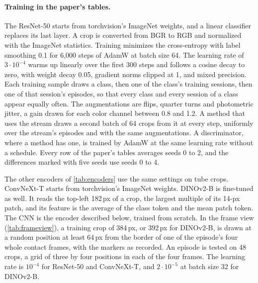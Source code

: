 \documentclass[10pt,twocolumn,letterpaper]{article}
\begin{document}
\paragraph{Training in the paper's tables.} The ResNet-50 starts from torchvision's ImageNet weights, and a linear classifier replaces its last layer. A crop is converted from BGR to RGB and normalized with the ImageNet statistics. Training minimizes the cross-entropy with label smoothing 0.1 for 6{,}000 steps of AdamW at batch size 64. The learning rate of $3\cdot10^{-4}$ warms up linearly over the first 300 steps and follows a cosine decay to zero, with weight decay 0.05, gradient norms clipped at 1, and mixed precision. Each training sample draws a class, then one of the class's training sessions, then one of that session's episodes, so that every class and every session of a class appear equally often. The augmentations are flips, quarter turns and photometric jitter, a gain drawn for each color channel between 0.8 and 1.2. A method that uses the stream draws a second batch of 64 crops from it at every step, uniformly over the stream's episodes and with the same augmentations. A discriminator, where a method has one, is trained by AdamW at the same learning rate without a schedule. Every row of the paper's tables averages seeds 0 to 2, and the differences marked with five seeds use seeds 0 to 4.

The other encoders of \cref{tab:encoders} use the same settings on tube crops. ConvNeXt-T starts from torchvision's ImageNet weights. DINOv2-B is fine-tuned as well. It reads the top-left 182\,px of a crop, the largest multiple of its 14-px patch, and its feature is the average of the class token and the mean patch token. The CNN is the encoder described below, trained from scratch. In the frame view (\cref{tab:frameview}), a training crop of 384\,px, or 392\,px for DINOv2-B, is drawn at a random position at least 64\,px from the border of one of the episode's four whole contact frames, with the markers as recorded. An episode is tested on 48 crops, a grid of three by four positions in each of the four frames. The learning rate is $10^{-4}$ for ResNet-50 and ConvNeXt-T, and $2\cdot10^{-5}$ at batch size 32 for DINOv2-B.
\end{document}

